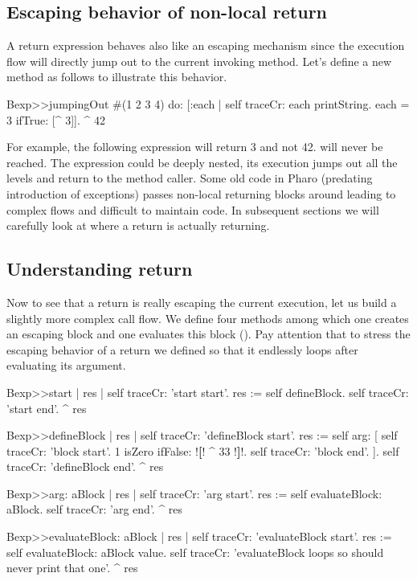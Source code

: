 \documentclass[a4paper,10pt,twoside]{book}
\begin{document}
%
%


\subsection{Escaping behavior of non-local return}
A return expression behaves also like an escaping mechanism since the execution flow will directly jump out to the current invoking method. Let's define a new method  as follows to illustrate this behavior.

\begin{code}{}
Bexp>>jumpingOut
	#(1 2 3 4) do: [:each |
					self traceCr: each printString.
					each = 3
						ifTrue: [^ 3]].
	^ 42
\end{code}


For example, the following expression  will return 3 and not 42.  will never be reached. The expression \ct{[ ^3 ]} could be deeply nested, its execution jumps out all the levels and return to the method caller. Some old code in Pharo (predating introduction of exceptions) passes non-local returning blocks around leading to complex flows and difficult to maintain code. In subsequent sections we will carefully look at where a return is actually returning.

\subsection{Understanding return}
Now to see that a return is really escaping the current execution, let us build a slightly more complex call flow. We define four methods among which one creates an escaping block  and one evaluates this block (). Pay attention that to stress the escaping behavior of a return we defined  so that it endlessly loops after evaluating its argument.

\begin{code}{}
Bexp>>start
	| res |
	self traceCr: 'start start'.
	res := self defineBlock.
	self traceCr: 'start end'.
	^ res

Bexp>>defineBlock
	| res |
	self traceCr: 'defineBlock start'.
	res := self arg: [ self traceCr: 'block start'.
                            1 isZero ifFalse: !\textbf{[}! ^ 33 !\textbf{]}!.
                            self traceCr: 'block end'. ].
	self traceCr: 'defineBlock end'.
	^ res

Bexp>>arg: aBlock
	| res |
	self traceCr: 'arg start'.
	res := self evaluateBlock: aBlock.
	self traceCr: 'arg end'.
	^ res

Bexp>>evaluateBlock: aBlock
	| res |
	self traceCr: 'evaluateBlock start'.
	res := self evaluateBlock: aBlock value.
	self traceCr: 'evaluateBlock loops so should never print that one'.
	^  res
\end{code}
\end{document}
